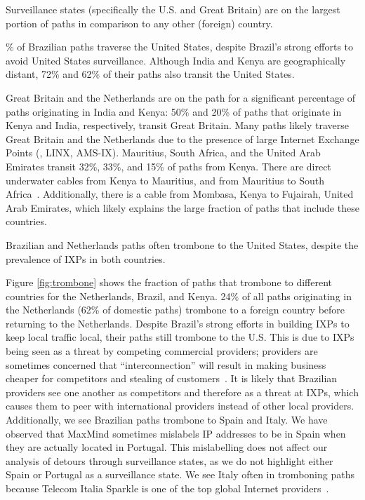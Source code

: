 \begin{finding}
Surveillance states (specifically the U.S. and Great Britain) are on the largest portion of paths in comparison to any other (foreign) country.
\end{finding}
\% of Brazilian paths traverse the United States, despite Brazil's
strong efforts to avoid United States surveillance.  Although India and
Kenya are geographically distant, 72\% and 62\% of their paths also transit
the United States.

Great Britain and the Netherlands are on the path for a significant
percentage of paths originating in India and Kenya: 50\% and 20\% of
paths that originate in Kenya and India, respectively, transit Great
Britain.   Many paths likely traverse Great Britain and the Netherlands due to
the presence of large Internet Exchange Points (\ie, LINX, AMS-IX).
Mauritius, South Africa, and the United Arab Emirates transit 32\%,
33\%, and 15\% of paths from Kenya.  There are direct underwater cables
from Kenya to Mauritius, and from Mauritius to South
Africa~\cite{cablemap}.  Additionally, there is a cable from Mombasa,
Kenya to Fujairah, United Arab Emirates, which likely explains the large
fraction of paths that include these countries. 



\begin{finding}
Brazilian and Netherlands paths often trombone to the United States, despite the prevalence of IXPs in both countries.
\end{finding}
\noindent
Figure \ref{fig:trombone}
shows the fraction of paths that trombone to
different countries for the Netherlands, Brazil, and Kenya. 24\% of
all paths originating in the Netherlands (62\% of domestic paths)
trombone to a foreign country before returning to the
Netherlands. Despite Brazil's strong efforts in building IXPs to keep
local traffic local, 
their paths still trombone to the U.S.  This is due to IXPs being seen
as a threat by competing commercial providers; providers are sometimes
concerned that ``interconnection'' will result in making business
cheaper for competitors and stealing of customers~\cite{ixp_policy}.
It is likely that Brazilian providers see one another as competitors and therefore as a threat at IXPs, which causes them to peer with international providers instead of other local providers.  Additionally, we see Brazilian paths trombone to Spain and Italy. We have observed that MaxMind sometimes mislabels IP addresses to be in Spain when they are actually located in Portugal.  This mislabelling does not affect our analysis of detours through surveillance states, as we do not highlight either Spain or Portugal as a surveillance state.  We see Italy often in tromboning paths because Telecom Italia Sparkle is one of the top global Internet providers~\cite{bakers}.

